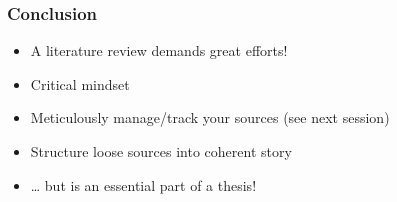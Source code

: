 \documentclass[aspectratio=169]{beamer}
\begin{document}
    \begin{frame}
        \frametitle{Conclusion}
        
        \begin{itemize}
            \item A literature review demands great efforts!
            \item Critical mindset
            \item Meticulously manage/track your sources (see next session)
            \item Structure loose sources into coherent story
            \item \ldots{} but is an essential part of a thesis!
        \end{itemize}
        
    \end{frame}
    
\end{document}
